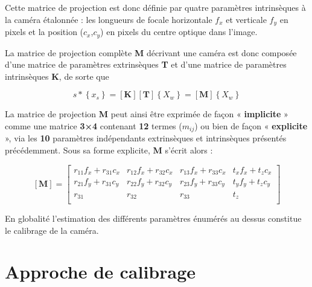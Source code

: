   Cette matrice de projection est donc définie par quatre paramètres intrinsèques à la caméra étalonnée : les longueurs de focale horizontale $f_x$ et verticale $f_y$ en pixels et la position ($c_x$,$c_y$) en pixels du centre optique dans l’image.
  
  La matrice de projection complète \textbf{M} décrivant une caméra est donc composée d’une matrice de paramètres extrinsèques \textbf{T} et d’une matrice de paramètres intrinsèques \textbf{K}, de sorte que
  
   \begin{equation}
  s
  *
  \left\{ x_s \right\}
  =
  \left[ \textbf{K} \right] 
  \left[ \textbf{T} \right]
  \left\{ X_w \right\} 
  =
  \left[ \textbf{M} \right]
  \left\{ X_w \right\} 
\end{equation}
  
  La matrice de projection \textbf{M} peut ainsi être exprimée de façon « \textbf{implicite} » comme une matrice \textbf{3×4} contenant \textbf{12} termes ($m_{ij}$) ou bien de façon « \textbf{explicite} », via les \textbf{10} paramètres indépendants extrinsèques et intrinsèques présentés précédemment. Sous sa forme explicite, \textbf{M} s’écrit alors :
  
   \begin{equation}
  \left[ \textbf{M} \right]
  =
  \left[ 
  \begin{array}{cccc}
  	r_{11}f_x + r_{31}c_x & r_{12}f_x + r_{32}c_x & r_{13}f_x + r_{33}c_x & t_xf_x + t_zc_x \\
  	r_{21}f_y + r_{31}c_y & r_{22}f_y + r_{32}c_y & r_{23}f_y + r_{33}c_y & t_yf_y + t_zc_y \\
  	r_{31} & r_{32} & r_{33} & t_z\\
  \end{array}
  \right]
\end{equation}
  
  En globalité l'estimation des différents paramètres énumérés au dessus constitue le calibrage de la caméra.\\
  
  
  
  \newpage
  
  \section{Approche de calibrage}
  
